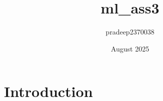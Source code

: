 \documentclass{article}
\title{ml_ass3}
\author{pradeep2370038 }
\date{August 2025}
\begin{document}
\maketitle

\section{Introduction}
\end{document}
